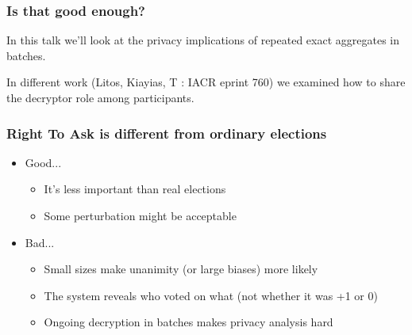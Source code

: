\documentclass[10pt,xcolor=svgnames,169]{beamer} %
\begin{document}
	\begin{frame}
	\frametitle{Is that good enough?}	
		
	In this talk we'll look at the privacy implications of repeated exact aggregates in batches.
	
	In different work (Litos, Kiayias, T : IACR eprint 760) we examined how to share
	the decryptor role among participants.
	\end{frame}	
	

	
	\begin{frame}
	\frametitle{Right To Ask is different from ordinary elections}	
	
\begin{itemize}

	\item Good...
	\begin{itemize}
	\item It's less important than real elections
	\item Some perturbation might be acceptable
	\end{itemize}
	\item Bad...
\begin{itemize}
	\item Small sizes make unanimity (or large biases) more likely
	\item The system reveals who voted on what (not whether it was +1 or 0)
	\item Ongoing decryption in batches makes privacy analysis hard
\end{itemize}
\end{itemize}
\end{frame}	
\end{document}
